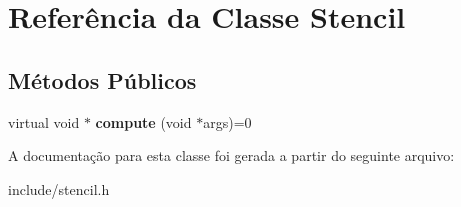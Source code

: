 \hypertarget{classStencil}{
\section{Referência da Classe Stencil}
\label{classStencil}
}
\subsection*{Métodos Públicos}
\begin{DoxyCompactItemize}
\item 
\hypertarget{classStencil_a085c233a026bb2a93cd16d963ec4f114}{
virtual void $\ast$ {\bfseries compute} (void $\ast$args)=0}
\label{classStencil_a085c233a026bb2a93cd16d963ec4f114}

\end{DoxyCompactItemize}


A documentação para esta classe foi gerada a partir do seguinte arquivo:\begin{DoxyCompactItemize}
\item 
include/stencil.h\end{DoxyCompactItemize}
